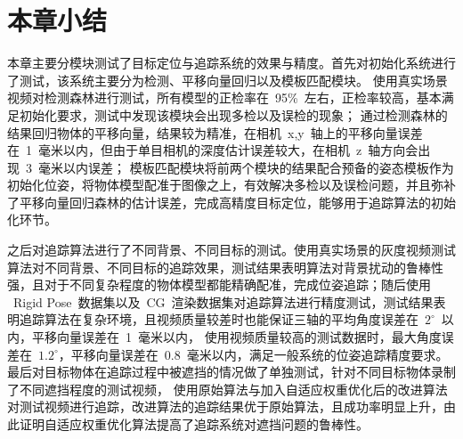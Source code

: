 \section{本章小结}
\label{sec:test_summary}
本章主要分模块测试了目标定位与追踪系统的效果与精度。首先对初始化系统进行了测试，该系统主要分为检测、平移向量回归以及模板匹配模块。
使用真实场景视频对检测森林进行测试，所有模型的正检率在~95\%~左右，正检率较高，基本满足初始化要求，测试中发现该模块会出现多检以及误检的现象；
通过检测森林的结果回归物体的平移向量，结果较为精准，在相机~x,y~轴上的平移向量误差在~1~毫米以内，但由于单目相机的深度估计误差较大，在相机~z~轴方向会出现~3~毫米以内误差；
模板匹配模块将前两个模块的结果配合预备的姿态模板作为初始化位姿，将物体模型配准于图像之上，有效解决多检以及误检问题，并且弥补了平移向量回归森林的估计误差，完成高精度目标定位，能够用于追踪算法的初始化环节。

之后对追踪算法进行了不同背景、不同目标的测试。使用真实场景的灰度视频测试算法对不同背景、不同目标的追踪效果，测试结果表明算法对背景扰动的鲁棒性强，且对于不同复杂程度的物体模型都能精确配准，完成位姿追踪；随后使用
~Rigid Pose~数据集以及~CG~渲染数据集对追踪算法进行精度测试，测试结果表明追踪算法在复杂环境，且视频质量较差时也能保证三轴的平均角度误差在~$2^\circ$~以内，平移向量误差在~1~毫米以内，
使用视频质量较高的测试数据时，最大角度误差在~$1.2^\circ$，平移向量误差在~0.8~毫米以内，满足一般系统的位姿追踪精度要求。最后对目标物体在追踪过程中被遮挡的情况做了单独测试，针对不同目标物体录制了不同遮挡程度的测试视频，
使用原始算法与加入自适应权重优化后的改进算法对测试视频进行追踪，改进算法的追踪结果优于原始算法，且成功率明显上升，由此证明自适应权重优化算法提高了追踪系统对遮挡问题的鲁棒性。